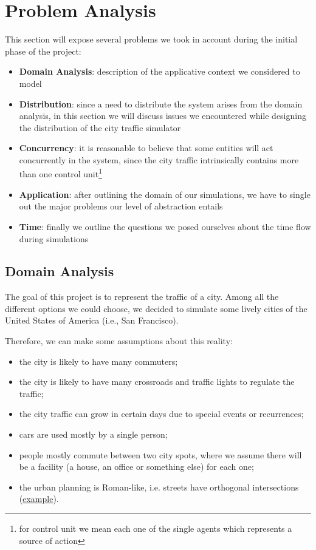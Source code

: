\section{Problem Analysis}

This section will expose several problems we took in account during the
initial phase of the project:

\begin{itemize}
\item \textbf{Domain Analysis}: description of the applicative context we
  considered to model
\item \textbf{Distribution}: since a need to distribute the system arises from
  the domain analysis, in this section we will discuss issues we encountered
  while designing the distribution of the city traffic simulator
\item \textbf{Concurrency}: it is reasonable to believe that some entities
  will act concurrently in the system, since the city traffic intrinsically
  contains more than one control unit\footnote{for control unit we mean each
  one of the single agents which represents a source of action}
\item \textbf{Application}: after outlining the domain of our simulations, we
  have to single out the major problems our level of abstraction entails
\item \textbf{Time}: finally we outline the questions we posed ourselves about
  the time flow during simulations
\end{itemize}


\subsection{Domain Analysis}\label{sec:pa-domain}
The goal of this project is to represent the traffic of a city. Among all the
different options we could choose, we decided to simulate some lively cities of
the United States of America (i.e., San Francisco).

Therefore, we can make some assumptions about this reality:

\begin{itemize}
\item the city is likely to have many commuters;
\item the city is likely to have many crossroads and traffic lights to
  regulate the traffic;
\item the city traffic can grow in certain days due to special events or
  recurrences;
\item cars are used mostly by a single person;
\item people mostly commute between two city spots, where we assume there
  will be a facility (a house, an office or something else) for each one;
\item the urban planning is Roman-like, i.e. streets have orthogonal
  intersections (\href{https://www.google.it/maps/place/San+Francisco,+California,+Stati+Uniti/@37.7766566,-122.4330836,16z/data=!4m2!3m1!1s0x80859a6d00690021:0x4a501367f076adff}{example}).
\end{itemize}

